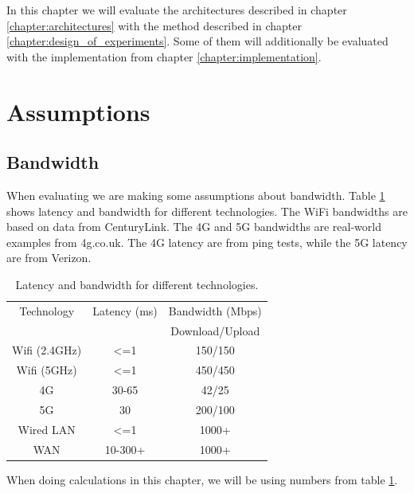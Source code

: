 In this chapter we will evaluate the architectures described in chapter \ref{chapter:architectures} with the method described in chapter \ref{chapter:design_of_experiments}. Some of them will additionally be evaluated with the implementation from chapter \ref{chapter:implementation}.






\section{Assumptions}
\subsection{Bandwidth}
When evaluating we are making some assumptions about bandwidth. Table \ref{tab:Bandwidth_latency} shows latency and bandwidth for different technologies. The WiFi bandwidths are based on data from CenturyLink\cite{noauthor_24_nodate}. The 4G and 5G bandwidths are real-world examples from 4g.co.uk\cite{noauthor_how_nodate}. The 4G latency are from ping tests, while the 5G latency are from Verizon\cite{noauthor_what_2020}.

\begin{table}[h!]
    \centering
    \begin{tabular}[c]{|c|c|c|}
        \hline
        Technology & Latency (ms) & Bandwidth (Mbps) \\
            &   &  Download/Upload \\
        \hline
        \hline
        Wifi (2.4GHz) & <=1 & 150/150  \\
        \hline
        Wifi (5GHz) & <=1 & 450/450  \\
        \hline
        4G & 30-65 & 42/25  \\
        \hline
        5G & 30 & 200/100  \\
        \hline
        Wired LAN & <=1 & 1000+  \\
        \hline
        WAN & 10-300+ & 1000+  \\
        \hline
        
        
    \end{tabular}
    \caption{Latency and bandwidth for different technologies.}
    \label{tab:Bandwidth_latency}
\end{table}
When doing calculations in this chapter, we will be using numbers from table \ref{tab:Bandwidth_latency}.




